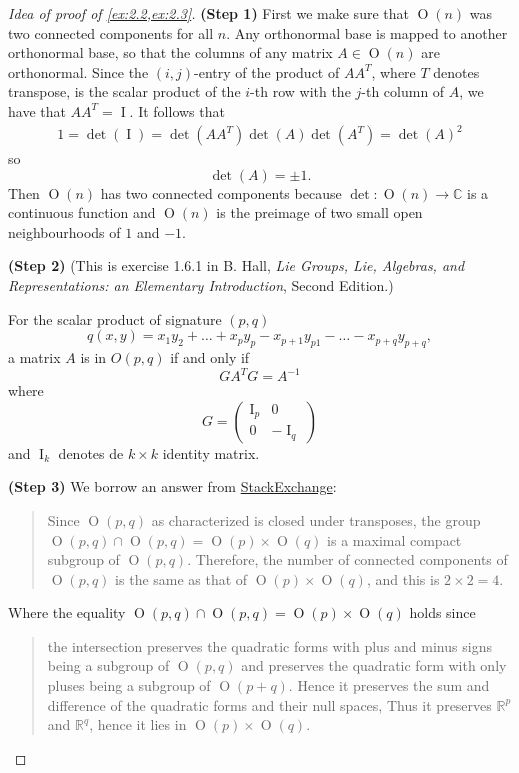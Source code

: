 \documentclass{article}
\numberwithin{equation}{section}
\newcommand{\R}{\mathbb{R}}
\newcommand{\C}{\mathbb{C}}
\renewcommand{\O}{\operatorname{O}}
\DeclareMathOperator{\I}{I}
\begin{document}
	\begin{proof}[Idea of proof of \cref{ex:2.2,ex:2.3}]\leavevmode
		
		\textbf{(Step 1)} First we make sure that $\O(n)$ was two connected components for all $n$. Any orthonormal base is mapped to another orthonormal base, so that the columns of any matrix $A\in\O(n)$ are orthonormal. Since the $(i,j)$-entry of the product of $AA^T$, where $T$ denotes transpose, is the scalar product of the $i$-th row with the $j$-th column of $A$, we have that $AA^T=\I$. It follows that
		\begin{align*}
			1=\det(\I)=\det(AA^T)\det(A)\det(A^T)=\det(A)^2
		\end{align*}
		so
		\[\det(A)=\pm1.\]
		Then $\O(n)$ has two connected components because $\det:\O(n)\to\C$ is a continuous function and $\O(n)$ is the preimage of two small open neighbourhoods of $1$ and $-1$.
		
		\textbf{(Step 2)} \iffalse Next we claim that if $q(x,y)=x_1y_1-x_2y_2$, a matrix $A$ is in $O(1,1)$ if and only if \[GA^TG=A^{-1}\] where
		\[G=\begin{pmatrix}
			1&0\\
			0&-1
		\end{pmatrix}.\]\fi
		(This is exercise 1.6.1 in B. Hall, \textit{Lie Groups, Lie, Algebras, and Representations: an Elementary Introduction}, Second Edition.)
		
		For the scalar product of signature $(p,q)$ \[q(x,y)=x_1y_2+\ldots+x_py_p-x_{p+1}y_{p
			1}-\ldots-x_{p+q}y_{p+q},\]
		a matrix $A$ is in $O(p,q)$ if and only if \[GA^TG=A^{-1}\] where
		\[G=\begin{pmatrix}
			\I_p&0\\
			0&-\I_q
		\end{pmatrix}\]
		and $\I_k$ denotes de $k\times k$ identity matrix.
		
		\textbf{(Step 3)} We borrow an answer from \href{https://mathoverflow.net/questions/297985/why-is-onk-not-connected-and-has-four-connected-components?_gl=1*e8aadb*_ga*MjE5NTQwOTAxLjE3MTE3MzY5Njk.*_ga_S812YQPLT2*MTcxMTczNjk2OS4xLjAuMTcxMTczNjk2OS4wLjAuMA..}{StackExchange}:
		\begin{quote}
			Since $\O(p,q)$ as characterized is closed under transposes, the group $\O(p,q)\cap\O(p,q)=\O(p)\times\O(q)$ is a maximal compact subgroup of $\O(p,q)$. Therefore, the number of connected components of $\O(p,q)$ is the same as that of $\O(p)\times\O(q)$, and this is $2\times 2=4$.
		\end{quote}
		Where the equality $\O(p,q)\cap\O(p,q)=\O(p)\times\O(q)$ holds since
		\begin{quote}
			the intersection preserves the quadratic forms with plus and minus signs being a subgroup of $\O(p,q)$ and preserves the quadratic form with only pluses being a subgroup of $\O(p+q)$. Hence it preserves the sum and difference of the quadratic forms and their null spaces, Thus it preserves $\R^p$ and $\R^q$, hence it lies in $\O(p)\times\O(q)$.
		\end{quote}
		

\end{proof}
\end{document}
